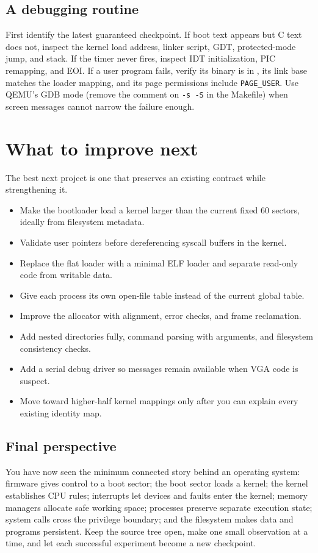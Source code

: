 \documentclass[11pt,oneside]{book}
\newcommand{\pathname}[1]{\texttt{\detokenize{#1}}}
\begin{document}
\section{A debugging routine}
First identify the latest guaranteed checkpoint. If boot text appears but C text does not, inspect the kernel load address, linker script, GDT, protected-mode jump, and stack. If the timer never fires, inspect IDT initialization, PIC remapping, and EOI. If a user program fails, verify its binary is in \pathname{rootfs}, its link base matches the loader mapping, and its page permissions include \texttt{PAGE\_USER}. Use QEMU's GDB mode (remove the comment on \texttt{-s -S} in the Makefile) when screen messages cannot narrow the failure enough.

\chapter{What to improve next}
The best next project is one that preserves an existing contract while strengthening it.

\begin{itemize}
\item Make the bootloader load a kernel larger than the current fixed 60 sectors, ideally from filesystem metadata.
\item Validate user pointers before dereferencing syscall buffers in the kernel.
\item Replace the flat loader with a minimal ELF loader and separate read-only code from writable data.
\item Give each process its own open-file table instead of the current global table.
\item Improve the allocator with alignment, error checks, and frame reclamation.
\item Add nested directories fully, command parsing with arguments, and filesystem consistency checks.
\item Add a serial debug driver so messages remain available when VGA code is suspect.
\item Move toward higher-half kernel mappings only after you can explain every existing identity map.
\end{itemize}

\section*{Final perspective}
You have now seen the minimum connected story behind an operating system: firmware gives control to a boot sector; the boot sector loads a kernel; the kernel establishes CPU rules; interrupts let devices and faults enter the kernel; memory managers allocate safe working space; processes preserve separate execution state; system calls cross the privilege boundary; and the filesystem makes data and programs persistent. Keep the source tree open, make one small observation at a time, and let each successful experiment become a new checkpoint.
\end{document}
